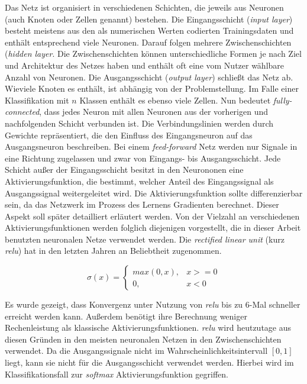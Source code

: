 \documentclass[a4paper,11pt]{article}
\begin{document}
Das Netz ist organisiert in verschiedenen Schichten, die jeweils aus Neuronen (auch Knoten oder Zellen genannt) bestehen. Die Eingangsschicht (\textit{input layer}) besteht meistens aus den als numerischen Werten codierten Trainingsdaten und enthält entsprechend viele Neuronen. Darauf folgen mehrere Zwischenschichten (\textit{hidden layer}. Die Zwischenschichten können unterschiedliche Formen je nach Ziel und Architektur des Netzes haben und enthält oft eine vom Nutzer wählbare Anzahl von Neuronen. Die Ausgangsschicht (\textit{output layer}) schließt das Netz ab. Wieviele Knoten es enthält, ist abhängig von der Problemstellung. Im Falle einer Klassifikation mit $n$ Klassen enthält es ebenso viele Zellen. Nun bedeutet \textit{fully-connected}, dass jedes Neuron mit allen Neuronen aus der vorherigen und nachfolgenden Schicht verbunden ist. Die Verbindungslinien werden durch Gewichte repräsentiert, die den Einfluss des Eingangsneuron auf das Ausgangsneuron beschreiben. Bei einem \textit{feed-forward} Netz werden nur Signale in eine Richtung  zugelassen und zwar von Eingangs- bis Ausgangsschicht. Jede Schicht außer der Eingangsschicht besitzt in den Neurononen eine Aktivierungsfunktion, die bestimmt, welcher Anteil des Eingangssignal als Ausgangssignal weitergeleitet wird. Die Aktivierungsfunktion sollte differenzierbar sein, da das Netzwerk im Prozess des Lernens Gradienten berechnet. Dieser Aspekt soll später detailliert erläutert werden. Von der Vielzahl an verschiedenen Aktivierungsfunktionen werden folglich diejenigen vorgestellt, die in dieser Arbeit benutzten neuronalen Netze verwendet werden. Die \textit{rectified linear unit} (kurz \textit{relu}) hat in den letzten Jahren an Beliebtheit zugenommen.

\[\sigma(x) = 
\begin{cases}
max(0,x), & x >= 0 \\
0, & x <0
\end{cases}{}
\]

Es wurde gezeigt, dass Konvergenz unter Nutzung von \textit{relu} bis zu 6-Mal schneller erreicht werden kann. Außerdem benötigt ihre Berechnung weniger Rechenleistung als klassische Aktivierungsfunktionen. \textit{relu} wird heutzutage aus diesen Gründen in den meisten neuronalen Netzen in den Zwischenschichten verwendet. Da die Ausgangssignale nicht im Wahrscheinlichkeitsintervall $\left[0, 1\right]$ liegt, kann sie nicht für die Ausgangsschicht verwendet werden. Hierbei wird im Klassifikationsfall zur \textit{softmax} Aktivierungsfunktion gegriffen. 
\end{document}
